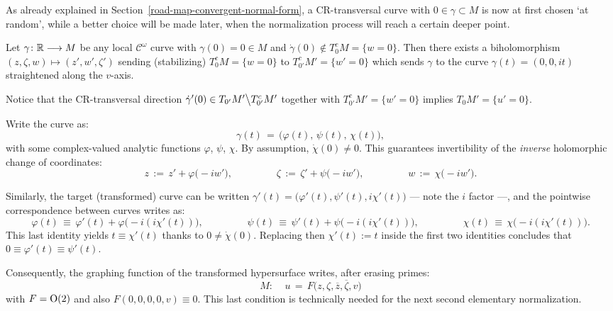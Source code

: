 \documentclass[12pt,twoside,leqno,openany]{amsart}
\begin{document}
As already explained in 
Section~{\ref{road-map-convergent-normal-form}},
a CR-transversal curve with $0 \in \gamma \subset M$ 
is now at first chosen `at random',
while a better choice will be made later, when
the normalization process will reach a certain deeper point.

\begin{Lemma}
Let $\gamma \colon \mathbb{R} \longrightarrow M$ be any local
$\mathcal{C}^\omega$ curve with $\gamma(0) = 0 \in M$ and
$\dot{\gamma}(0) \not\in T_{0}^cM = \{w = 0\}$.  Then there exists
a biholomorphism $(z, \zeta, w) \longmapsto (z', w', \zeta')$
sending (stabilizing) $T_0^c M = \{w=0\}$ to
$T_{0'}^c M' = \{ w' = 0\}$ 
which sends $\gamma$ to the curve
$\gamma(t) = (0, 0, it)$ straightened along the $v$-axis.
\end{Lemma}

Notice that the CR-transversal direction 
$\dot{\gamma}'(0) \in T_{0'} M' \big\backslash
T_{0'}^c M'$ together with $T_{0'}^c M' = \{ w' = 0\}$ 
implies $T_0 M' = \{ u' = 0\}$.

\proof
Write the curve as:
\[
\gamma(t)
\,=\,
\big(
\varphi(t),\,
\psi(t),\,
\chi(t)
\big),
\]
with some complex-valued analytic functions
$\varphi$, $\psi$, $\chi$. 
By assumption, $\dot{\chi}(0) \neq 0$. 
This guarantees invertibility of the {\em inverse} holomorphic 
change of coordinates:
\[
z
\,:=\,
z'
+
\varphi\big(-iw'\big),
\ \ \ \ \ \ \ \ \ \ \ \ \ \ \ \ \ \ \ \
\zeta
\,:=\,
\zeta'
+
\psi\big(-iw'\big),
\ \ \ \ \ \ \ \ \ \ \ \ \ \ \ \ \ \ \ \
w
\,:=\,
\chi\big(-iw'\big).
\]

Similarly, the target (transformed)
curve can be written $\gamma'(t) = 
\big( \varphi'(t), \psi'(t), i \chi'(t) \big)$\,\,---\,\,note
the $i$ factor\,\,---, and the 
pointwise correspondence
between curves writes as:
\[
\varphi(t)
\,\equiv\,
\varphi'(t)
+
\varphi\big(
-i(i\chi'(t))\big),
\ \ \ \ \ \ \ \ \ \ \ \ \ \ \ \ \ \ \ \
\psi(t)
\,\equiv\,
\psi'(t)
+
\psi\big(
-i(i\chi'(t))\big),
\ \ \ \ \ \ \ \ \ \ \ \ \ \ \ \ \ \ \ \
\chi(t)
\,\equiv\,
\chi\big(
-i(i\chi'(t))\big).
\]
This last identity yields $t \equiv \chi'(t)$ thanks to 
$0 \neq \dot{\chi}(0)$. Replacing then $\chi'(t) := t$ inside
the first two identities 
concludes that $0 \equiv \varphi'(t) \equiv \psi'(t)$.
\endproof

Consequently, the graphing function of the transformed
hypersurface writes, after erasing primes:
\[
M
\colon\ \ \ \ \
u
\,=\,
F\big(z,\zeta,\overline{z},\overline{\zeta},v\big)
\]
with $F = {\rm O}(2)$ and also $F(0,0,0,0,v) \equiv 0$.
This last condition is
technically needed for the next second elementary normalization.
\end{document}
